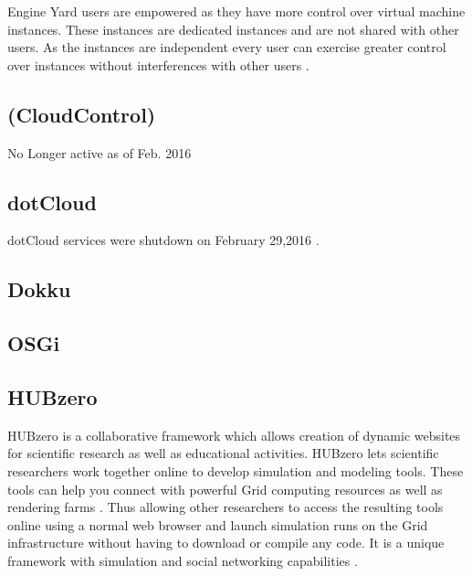     Engine Yard users are empowered as they have more control over
    virtual machine instances. These instances are dedicated instances
    and are not shared with other users. As the instances are
    independent every user can exercise greater control over instances
    without interferences with other users \cite{www-engineyard}.


\pv

\subsection{(CloudControl)}

    No Longer active as of Feb. 2016 \cite{www-wiki}

\subsection{dotCloud}

    dotCloud services were shutdown on February 29,2016 \cite{www-dotCloud}.

    \pv
    

\subsection{Dokku}

\pv 

\subsection{OSGi}

\pv 

\subsection{HUBzero}
     
     HUBzero is a collaborative framework which allows creation of
     dynamic websites for scientific research as well as educational
     activities.  HUBzero lets scientific researchers work together
     online to develop simulation and modeling tools.  These tools can
     help you connect with powerful Grid computing resources as well
     as rendering farms \cite{hubzerowebsite}. Thus allowing other
     researchers to access the resulting tools online using a normal
     web browser and launch simulation runs on the Grid infrastructure
     without having to download or compile any code. It is a unique
     framework with simulation and social networking
     capabilities \cite{hubzeropaper2010}.

